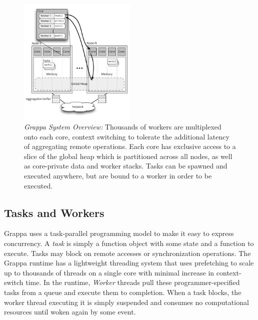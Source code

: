 \begin{figure}[t]
  \centering
  \includegraphics[width=0.5\textwidth]{figs/grappa_system.pdf}
  \caption{\emph{Grappa System Overview:}
    Thousands of workers are multiplexed onto each core, context switching to tolerate the additional latency of aggregating remote operations. Each core has exclusive access to a slice of the global heap which is partitioned across all nodes, as well as core-private data and worker stacks. Tasks can be spawned and executed anywhere, but are bound to a worker in order to be executed.
  }
  \label{fig:system}
\end{figure}

\subsection{Tasks and Workers}
Grappa uses a task-parallel programming model to make it easy to express concurrency.
A \emph{task} is simply a function object with some state and a function to execute.
Tasks may block on remote accesses or synchronization operations.
The Grappa runtime has a lightweight threading system that uses prefetching to scale up to thousands of threads on a single core with minimal increase in context-switch time.
In the runtime, \emph{Worker} threads pull these programmer-specified tasks from a queue and execute them to completion. When a task blocks, the worker thread executing it is simply suspended and consumes no computational resources until woken again by some event.

